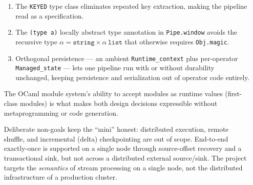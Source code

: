 \documentclass[11pt,a4paper]{article}
\begin{document}
\begin{enumerate}
\item The \texttt{KEYED} type class eliminates repeated key
  extraction, making the pipeline read as a specification.
\item The \texttt{(type a)} locally abstract type annotation in
  \texttt{Pipe.window} avoids the recursive type $\alpha = \mathtt{string}
  \times \alpha\ \mathtt{list}$ that otherwise requires \texttt{Obj.magic}.
\item Orthogonal persistence --- an ambient \texttt{Runtime\_context}
  plus per-operator \texttt{Managed\_state} --- lets one pipeline run
  with or without durability unchanged, keeping persistence and
  serialization out of operator code entirely.
\end{enumerate}

The OCaml module system's ability to accept modules as runtime values
(first-class modules) is what makes both design decisions expressible
without metaprogramming or code generation.

Deliberate non-goals keep the ``mini'' honest: distributed execution,
remote shuffle, and incremental (delta) checkpointing are out of scope.
End-to-end exactly-once is supported on a single node through
source-offset recovery and a transactional sink, but not across a
distributed external source/sink. The project targets the
{\it semantics} of stream processing on a single node, not the
distributed infrastructure of a production cluster.
\end{document}
